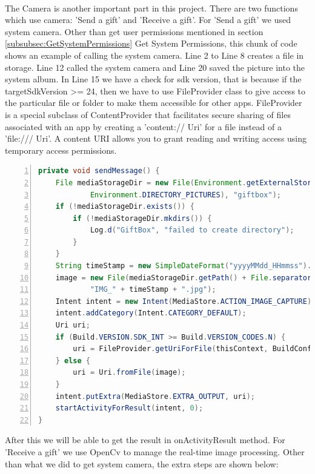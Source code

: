 \paragraph{} The Camera is another important part in this project. There are two functions which use camera: 'Send a gift' and 'Receive a gift'.
For 'Send a gift' we used system camera. Other than get user permissions mentioned in section \ref{subsubsec:GetSystemPermissions} Get System Permissions, this chunk of code shows an example of calling the system camera. Line 2 to Line 8 creates a file in storage. Line 12 called the system camera and Line 20 saved the picture into the system album. In Line 15 we have a check for sdk version, that is because if the targetSdkVersion >= 24, then we have to use FileProvider class to give access to the particular file or folder to make them accessible for other apps. FileProvider is a special subclass of ContentProvider that facilitates secure sharing of files associated with an app by creating a 'content:// Uri' for a file instead of a 'file:/// Uri'. A content URI allows you to grant reading and writing access using temporary access permissions. 
\begin{lstlisting}[language={java},
        numbers=left,basicstyle=\footnotesize\ttfamily,breaklines=true,xleftmargin=.05\textwidth, xrightmargin=.05\textwidth] 
private void sendMessage() {
    File mediaStorageDir = new File(Environment.getExternalStoragePublicDirectory(
            Environment.DIRECTORY_PICTURES), "giftbox");
    if (!mediaStorageDir.exists()) {
        if (!mediaStorageDir.mkdirs()) {
            Log.d("GiftBox", "failed to create directory");
        }
    }
    String timeStamp = new SimpleDateFormat("yyyyMMdd_HHmmss").format(new Date());
    image = new File(mediaStorageDir.getPath() + File.separator +
            "IMG_" + timeStamp + ".jpg");
    Intent intent = new Intent(MediaStore.ACTION_IMAGE_CAPTURE);
    intent.addCategory(Intent.CATEGORY_DEFAULT);
    Uri uri;
    if (Build.VERSION.SDK_INT >= Build.VERSION_CODES.N) {
        uri = FileProvider.getUriForFile(thisContext, BuildConfig.APPLICATION_ID+".fileprovider", image);//BuildConfig.APPLICATION_ID + ".fileProvider"
    } else {
        uri = Uri.fromFile(image);
    }
    intent.putExtra(MediaStore.EXTRA_OUTPUT, uri);
    startActivityForResult(intent, 0);
}
\end{lstlisting} 
\par After this we will be able to get the result in onActivityResult method. For 'Receive a gift' we use OpenCv to manage the real-time image processing. Other than what we did to get system camera, the extra steps are shown below:
